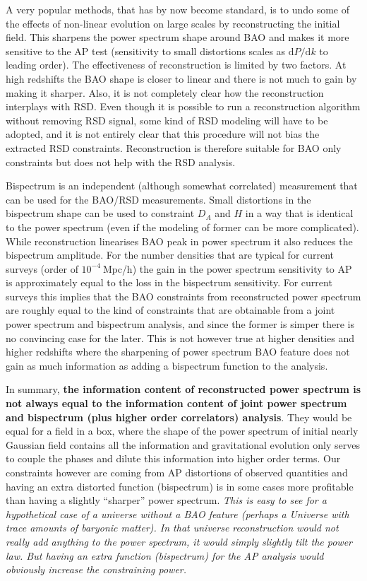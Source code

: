 A very popular methods, that has by now become standard, is to undo some of the
effects of non-linear evolution on large scales by reconstructing the initial
field. This sharpens the power spectrum shape around BAO and makes it more
sensitive to the AP test (sensitivity to small distortions scales as
$\mathrm{d}P/\mathrm{d}k$ to leading order). The effectiveness of
reconstruction is limited by two factors. At high redshifts the BAO shape is
closer to linear and there is not much to gain by making it sharper. Also, it
is not completely clear how the reconstruction interplays with RSD. Even though
it is possible to run a reconstruction algorithm without removing RSD signal,
some kind of RSD modeling will have to be adopted, and it is not entirely clear
that this procedure will not bias the extracted RSD constraints. Reconstruction
is therefore suitable for BAO only constraints but does not help with the RSD
analysis.

Bispectrum is an independent (although somewhat correlated) measurement that
can be used for the BAO/RSD measurements. Small distortions in the
bispectrum shape can be used to constraint $D_A$ and $H$ in a way that is
identical to the power spectrum (even if the modeling of former can be more
complicated). While reconstruction linearises BAO peak in power spectrum it
also reduces the bispectrum amplitude. For the number densities that are
typical for current surveys (order of $10^{-4}\ \mathrm{Mpc}$/h) the gain in
the power spectrum sensitivity to AP is approximately equal to the loss in the
bispectrum sensitivity. For current surveys this implies that the BAO
constraints from reconstructed power spectrum are roughly equal to the kind of
constraints that are obtainable from a joint power spectrum and bispectrum
analysis, and since the former is simper there is no convincing case for the
later. This is not however true at higher densities and higher redshifts where
the sharpening of power spectrum BAO feature does not gain as much information
as adding a bispectrum function to the analysis. 

In summary, \textbf{the information content of reconstructed power spectrum is not
always equal to the information content of joint power spectrum and bispectrum
(plus higher order correlators) analysis}. They would be equal for a field in a
box, where the shape of the power spectrum of initial nearly Gaussian field
contains all the information and gravitational evolution only serves to couple
the phases and dilute this information into higher order terms. Our constraints
however are coming from AP distortions of observed quantities and having an
extra distorted function (bispectrum) is in some cases more profitable than
having a slightly ``sharper'' power spectrum. \textit{This is easy to see for a
hypothetical case of a universe without a BAO feature (perhaps a Universe with
trace amounts of baryonic matter). In that universe reconstruction would not
really add anything to the power spectrum, it would simply slightly tilt the
power law. But having an extra function (bispectrum) for the AP analysis would
obviously increase the constraining power.}

